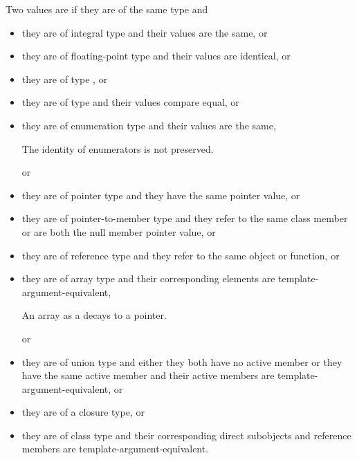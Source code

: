 \pnum
Two values are  if
they are of the same type and
\begin{itemize}
\item
they are of integral type and their values are the same, or

\item
they are of floating-point type and their values are identical, or

\item
they are of type , or

\item
they are of type  and
their values compare equal, or

\item
they are of enumeration type and their values are the same,
\begin{footnote}
The identity of enumerators is not preserved.
\end{footnote}
or

\item
they are of pointer type and they have the same pointer value, or

\item
they are of pointer-to-member type and they refer to the same class member
or are both the null member pointer value, or

\item
they are of reference type and they refer to the same object or function, or

\item
they are of array type and their corresponding elements are template-argument-equivalent,
\begin{footnote}
An array as a  decays to a pointer.
\end{footnote}
or

\item
they are of union type and either
they both have no active member or
they have the same active member and their active members are template-argument-equivalent, or

\item
they are of a closure type, or

\item
they are of class type and
their corresponding direct subobjects and reference members are template-argument-equivalent.
\end{itemize}

